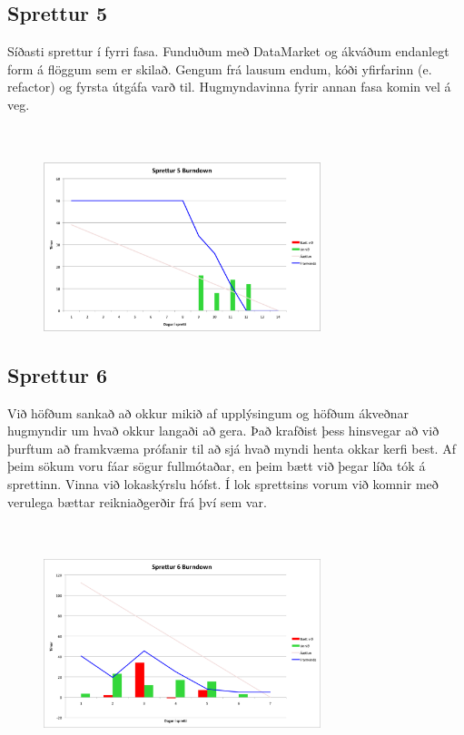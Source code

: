 \documentclass{article}
\begin{document}
\subsection{Sprettur 5}
Síðasti sprettur í fyrri fasa. Funduðum með DataMarket og ákváðum endanlegt form á
flöggum sem er skilað. Gengum frá lausum endum, kóði yfirfarinn 
(e. refactor) og fyrsta útgáfa varð til. Hugmyndavinna fyrir annan fasa komin vel á veg.
\hfil \\
\hfil \\
\hfil \\
\begin{figure}[H]
 \centering
 \includegraphics[width=0.72\textwidth]{Sprettur5_Burndown.png}
 \caption{}
\label{fig:sp5}
\end{figure}
\newpage
\subsection{Sprettur 6}
Við höfðum sankað að okkur mikið af upplýsingum og höfðum ákveðnar hugmyndir um
hvað okkur langaði að gera. Það krafðist þess hinsvegar að við 
þurftum að framkvæma prófanir til að sjá hvað myndi henta okkar kerfi best. 
Af þeim sökum voru fáar sögur fullmótaðar, en þeim bætt við þegar líða tók á sprettinn.
Vinna við lokaskýrslu hófst. Í lok sprettsins vorum við komnir með verulega bættar reikniaðgerðir frá því sem var.
\hfil \\
\hfil \\
\hfil \\
\begin{figure}[H]
 \centering
 \includegraphics[width=0.72\textwidth]{Sprettur6_Burndown.png}
 \caption{}
\label{fig:sp6}
\end{figure}
\newpage
\end{document}
